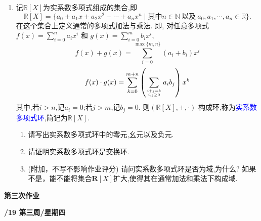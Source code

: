 \documentclass[a4paper,12pt]{article}
\begin{document}
\begin{enumerate}
 
 \item 记$\mathbb{R}[X]$为实系数多项式组成的集合,即
 \[\mathbb{R}[X]=\{a_0+a_1x+a_2x^2+\cdots+a_nx^n\mid 其中 n\in\mathbb{N} \ \text{以及} \ a_0,a_1,\cdots,a_n\in \mathbb{R} \}.\] 
 在这个集合上定义通常的多项式加法与乘法. 即, 对任意多项式 $f(x)=\sum\limits_{i=0}^{n}a_i x^{i}$ 和 $g(x)=\sum\limits_{i=0}^{m}b_i x^{i}$, 
 \[f(x)+g(x)=\sum_{i=0}^{\max\{m,n\}}(a_i+b_i) x^{i} \]
 \[f(x)\cdot g(x)=\sum_{k=0}^{m+n} \left(\sum_{i+j=k\atop i,j\geq 0}a_i b_j\right) x^{k}\]
 其中,若$i>n$,记$a_i=0$;若$j>m$,记$b_j=0$.
 则$(\mathbb{R}[X],+,\cdot)$ 构成环,称为\textcolor{blue}{实系数多项式环},简记为$\mathbb{R}[X]$. 
 \begin{enumerate}
 \item 请写出实系数多项式环中的零元,幺元以及负元.
 \item 请证明实系数多项式环是交换环.
 \item (附加，不写不影响作业评分) 请问实系数多项式环是否为域,为什么? 如果不是，能不能将集合$\mathbf{R}[X]$扩大,使得其在通常加法和乘法下构成域.
 \end{enumerate}
\end{enumerate}

\newpage
\head






\begin{center} %
	{\Large \bf 第三次作业} %
	\vspace{2mm}
	
	{\bf{}/19 \quad  第三周/星期四} %

\end{center} 
\end{document}
